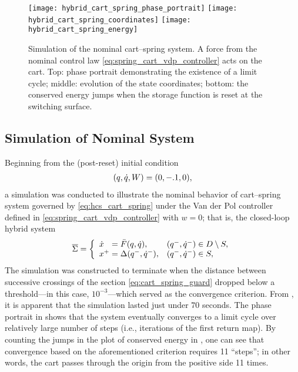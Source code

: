 \begin{figure*}[htp!]
  \centering
  \texttt{[image: hybrid\_cart\_spring\_phase\_portrait]}
  \texttt{[image: hybrid\_cart\_spring\_coordinates]}
  \texttt{[image: hybrid\_cart\_spring\_energy]}
  \caption[Simulation of the nominal cart--spring system.]{Simulation of the
    nominal cart--spring system.
    A force from the nominal control law \eqref{eq:spring_cart_vdp_controller}
    acts on the cart.
    Top: phase portrait demonstrating the existence of a limit cycle;
    middle: evolution of the state coordinates;
    bottom: the conserved energy jumps when the storage function is reset at the
    switching surface.}
  \label{fig:cart_spring_simulation_nominal}
\end{figure*}

\subsection{Simulation of Nominal System}
Beginning from the (post-reset) initial condition
\begin{align*}
  (q, \dot{q}, W) = (0, -.1, 0),
\end{align*}
a simulation was conducted to illustrate the nominal behavior of cart--spring
system governed by \eqref{eq:hcs_cart_spring} under the Van der Pol controller
defined in \eqref{eq:spring_cart_vdp_controller} with $w = 0$;
%
that is, the closed-loop hybrid system
\begin{align}
  \label{eq:hs_cart_spring_nominal}
  {\overline {\Sigma}} = \left\{
    \begin{array}{l l}
      {\dot {x}}\hphantom{^+} = {\bar {F}}(q, \dot{q}), & (q^{-}, \dot{q}^{-}) \in D \setminus S,\\
      x^{+} = \Delta(q^{-}, \dot{q}^{-}), & (q^{-}, \dot{q}^{-}) \in S,
    \end{array}\right.
\end{align}
%
The simulation was constructed to terminate when the distance between successive
crossings of the \Poincare{} section \eqref{eq:cart_spring_guard} dropped below
a threshold---in this case, $10^{-3}$---which served as the convergence
criterion.
%
From , it is apparent that the
simulation lasted just under $70$ seconds.
%
The phase portrait in  shows that the
system eventually converges to a limit cycle over relatively large number of
steps (i.e., iterations of the \Poincare{} first return map).
By counting the jumps in the plot of conserved energy in
, one can see that convergence based
on the aforementioned criterion requires 11 ``steps'';
%
in other words, the cart passes through the origin from the positive side 11
times.


